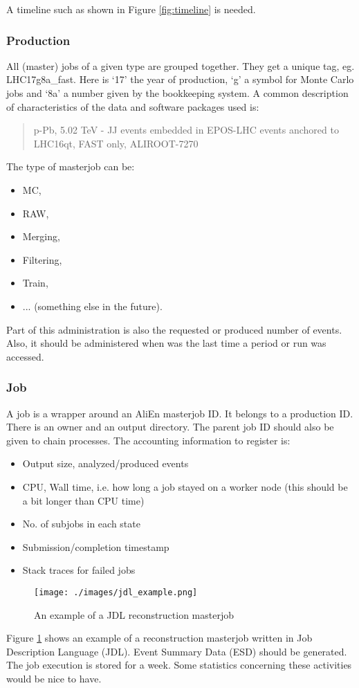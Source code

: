 A timeline such as shown in Figure \ref{fig:timeline} is needed.

\subsubsection{Production}
All (master) jobs of a given type are grouped together. They get a unique tag, eg. LHC17g8a\_fast. Here is `17' the year of production, `g' a symbol for Monte Carlo jobs and `8a' a number given by the bookkeeping system. A common description of characteristics of the data and software packages used is:
\begin{quotation}
p-Pb, 5.02 TeV - JJ events embedded in EPOS-LHC events anchored to LHC16qt, FAST only, ALIROOT-7270
\end{quotation}
The type of masterjob can be:
\begin{itemize}
  \item MC,
  \item RAW, 
  \item Merging, 
  \item Filtering, 
  \item Train, 
  \item ... (something else in the future).
\end{itemize}
Part of this administration is also the requested or produced number of events. Also, it should be administered when was the last time a period or run was accessed.

\subsubsection{Job}

A job is a wrapper around an AliEn masterjob ID. It belongs to a production ID. There is an owner and an output directory. The parent job ID should also be given to chain processes. The accounting information to register is:
\begin{itemize}
  \item Output size, analyzed/produced events
  \item CPU, Wall time, i.e. how long a job stayed on a worker node (this should be a bit longer than CPU time)
  \item No. of subjobs in each state
  \item Submission/completion timestamp
  \item Stack traces for failed jobs
\end{itemize}


\begin{figure}[h]
  \begin{center}
    \texttt{[image: ./images/jdl\_example.png]}
    \caption{An example of a JDL reconstruction masterjob}
    \label{fig:jdl_example}
  \end{center}
\end{figure}
Figure \ref{fig:jdl_example} shows an example of a reconstruction masterjob written in Job Description Language (JDL). Event Summary Data (ESD) should be generated. The job execution is stored for a week. Some statistics concerning these activities would be nice to have.

